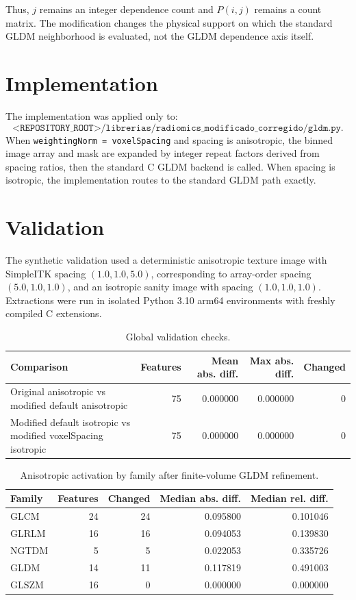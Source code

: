 \documentclass[11pt,a4paper]{article}
\begin{document}
Thus, \(j\) remains an integer dependence count and \(P(i,j)\) remains a count matrix. The modification changes the physical support on which the standard GLDM neighborhood is evaluated, not the GLDM dependence axis itself.

\section*{Implementation}
The implementation was applied only to:
\[
\texttt{<REPOSITORY_ROOT>/librerias/radiomics\_modificado\_corregido/gldm.py}.
\]
When \texttt{weightingNorm = voxelSpacing} and spacing is anisotropic, the binned image array and mask are expanded by integer repeat factors derived from spacing ratios, then the standard C GLDM backend is called. When spacing is isotropic, the implementation routes to the standard GLDM path exactly.

\section*{Validation}
The synthetic validation used a deterministic anisotropic texture image with SimpleITK spacing \((1.0,1.0,5.0)\), corresponding to array-order spacing \((5.0,1.0,1.0)\), and an isotropic sanity image with spacing \((1.0,1.0,1.0)\). Extractions were run in isolated Python 3.10 arm64 environments with freshly compiled C extensions.

\begin{table}[h]
\centering
\caption{Global validation checks.}
\begin{tabular}{lrrrr}
\toprule
Comparison & Features & Mean abs. diff. & Max abs. diff. & Changed \\
\midrule
Original anisotropic vs modified default anisotropic & 75 & 0.000000 & 0.000000 & 0 \\
Modified default isotropic vs modified voxelSpacing isotropic & 75 & 0.000000 & 0.000000 & 0 \\
\bottomrule
\end{tabular}
\end{table}

\begin{table}[h]
\centering
\caption{Anisotropic activation by family after finite-volume GLDM refinement.}
\begin{tabular}{lrrrr}
\toprule
Family & Features & Changed & Median abs. diff. & Median rel. diff. \\
\midrule
GLCM & 24 & 24 & 0.095800 & 0.101046 \\
GLRLM & 16 & 16 & 0.094053 & 0.139830 \\
NGTDM & 5 & 5 & 0.022053 & 0.335726 \\
GLDM & 14 & 11 & 0.117819 & 0.491003 \\
GLSZM & 16 & 0 & 0.000000 & 0.000000 \\
\bottomrule
\end{tabular}
\end{table}
\end{document}
